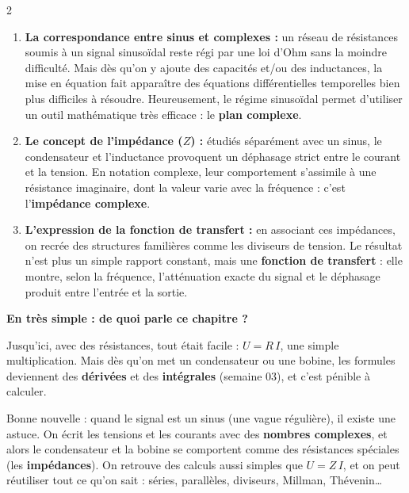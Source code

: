 \documentclass[a4paper,9pt]{extarticle}
\begin{document}
\begin{multicols}{2}
\begin{summary}
\begin{enumerate}[leftmargin=*,itemsep=1pt,topsep=1pt]

\item \textbf{La correspondance entre sinus et complexes :} un réseau de résistances soumis à un signal sinusoïdal reste régi par une loi d'Ohm sans la moindre difficulté. Mais dès qu'on y ajoute des capacités et/ou des inductances, la mise en équation fait apparaître des équations différentielles temporelles bien plus difficiles à résoudre. Heureusement, le régime sinusoïdal permet d'utiliser un outil mathématique très efficace : le \textbf{plan complexe}.

\item \textbf{Le concept de l'impédance ($Z$) :} étudiés séparément avec un sinus, le condensateur et l'inductance provoquent un déphasage strict entre le courant et la tension. En notation complexe, leur comportement s'assimile à une résistance imaginaire, dont la valeur varie avec la fréquence : c'est l'\textbf{impédance complexe}.

\item \textbf{L'expression de la fonction de transfert :} en associant ces impédances, on recrée des structures familières comme les diviseurs de tension. Le résultat n'est plus un simple rapport constant, mais une \textbf{fonction de transfert} : elle montre, selon la fréquence, l'atténuation exacte du signal et le déphasage produit entre l'entrée et la sortie.

\end{enumerate}

\end{summary}


\begin{important}

\textbf{En très simple : de quoi parle ce chapitre ?}

Jusqu'ici, avec des résistances, tout était facile : $U = R\,I$, une simple multiplication. Mais dès qu'on met un condensateur ou une bobine, les formules deviennent des \textbf{dérivées} et des \textbf{intégrales} (semaine 03), et c'est pénible à calculer.

\vspace{3pt}

Bonne nouvelle : quand le signal est un sinus (une vague régulière), il existe une astuce. On écrit les tensions et les courants avec des \textbf{nombres complexes}, et alors le condensateur et la bobine se comportent comme des \og résistances spéciales \fg{} (les \textbf{impédances}). On retrouve des calculs aussi simples que $U = Z\,I$, et on peut réutiliser tout ce qu'on sait : séries, parallèles, diviseurs, Millman, Thévenin\dots


\end{important}
\end{multicols}
\end{document}
